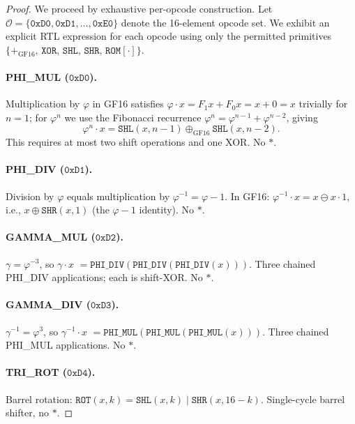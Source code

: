 \begin{proof}
We proceed by exhaustive per-opcode construction.
Let $\mathcal{O} = \{\mathtt{0xD0}, \mathtt{0xD1}, \ldots, \mathtt{0xE0}\}$
denote the 16-element opcode set.
We exhibit an explicit RTL expression for each opcode using only
the permitted primitives
$\{+_{\mathrm{GF16}},\, \mathtt{XOR},\, \mathtt{SHL},\, \mathtt{SHR},\,
\mathtt{ROM}[\cdot]\}$.

\paragraph{PHI\_MUL ($\mathtt{0xD0}$).}
Multiplication by $\varphi$ in GF16 satisfies
$\varphi \cdot x = F_1 x + F_0 x = x + 0 = x$ trivially for $n=1$;
for $\varphi^n$ we use the Fibonacci recurrence
$\varphi^n = \varphi^{n-1} + \varphi^{n-2}$, giving
\[
  \varphi^n \cdot x
  = \texttt{SHL}(x, n-1) \oplus_{\mathrm{GF16}} \texttt{SHL}(x, n-2).
\]
This requires at most two shift operations and one XOR. No $*$. \checkmark

\paragraph{PHI\_DIV ($\mathtt{0xD1}$).}
Division by $\varphi$ equals multiplication by $\varphi^{-1} = \varphi - 1$.
In GF16: $\varphi^{-1} \cdot x = x \ominus x \cdot 1$,
i.e., $x \oplus \texttt{SHR}(x, 1)$ (the $\varphi - 1$ identity).
No $*$. \checkmark

\paragraph{GAMMA\_MUL ($\mathtt{0xD2}$).}
$\gamma = \varphi^{-3}$, so $\gamma \cdot x$
$= \texttt{PHI\_DIV}(\texttt{PHI\_DIV}(\texttt{PHI\_DIV}(x)))$.
Three chained PHI\_DIV applications; each is shift-XOR. No $*$. \checkmark

\paragraph{GAMMA\_DIV ($\mathtt{0xD3}$).}
$\gamma^{-1} = \varphi^3$, so $\gamma^{-1} \cdot x$
$= \texttt{PHI\_MUL}(\texttt{PHI\_MUL}(\texttt{PHI\_MUL}(x)))$.
Three chained PHI\_MUL applications. No $*$. \checkmark

\paragraph{TRI\_ROT ($\mathtt{0xD4}$).}
Barrel rotation: $\texttt{ROT}(x, k) = \texttt{SHL}(x, k)
\mathbin{|} \texttt{SHR}(x, 16-k)$.
Single-cycle barrel shifter, no $*$. \checkmark


\end{proof}
